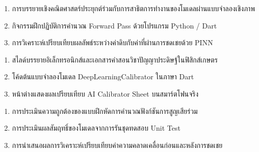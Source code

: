 \begin{tcolorbox}[
    enhanced, breakable,
    colback=white, colframe=rbruNavy,
    fonttitle=\bfseries\color{white},
    title={3. วิธีสอนและกิจกรรมการเรียนการสอน},
    arc=1.5mm, boxrule=0.8pt, leftrule=3.5mm
]
\begin{enumerate}
    \item การบรรยายเชิงคณิตศาสตร์ประยุกต์ร่วมกับการสาธิตการทำงานของโมเดลผ่านแบบจำลองเชิงภาพ
    \item กิจกรรมฝึกปฏิบัติการคำนวณ Forward Pass ด้วยโปรแกรม Python / Dart
    \item การวิเคราะห์เปรียบเทียบผลลัพธ์ระหว่างค่าดิบกับค่าที่ผ่านการชดเชยด้วย PINN
\end{enumerate}
\end{tcolorbox}

\begin{tcolorbox}[
    enhanced, breakable,
    colback=white, colframe=rbruNavy,
    fonttitle=\bfseries\color{white},
    title={4. สื่อการเรียนการสอน},
    arc=1.5mm, boxrule=0.8pt, leftrule=3.5mm
]
\begin{enumerate}
    \item สไลด์บรรยายอิเล็กทรอนิกส์และเอกสารคำสอนวิชาปัญญาประดิษฐ์ในฟิสิกส์เกษตร
    \item โค้ดต้นแบบจำลองโมเดล DeepLearningCalibrator ในภาษา Dart
    \item หน้าต่างแสดงผลเปรียบเทียบ AI Calibrator Sheet บนสมาร์ตโฟนจริง
\end{enumerate}
\end{tcolorbox}

\begin{tcolorbox}[
    enhanced, breakable,
    colback=white, colframe=rbruNavy,
    fonttitle=\bfseries\color{white},
    title={5. การวัดและประเมินผล},
    arc=1.5mm, boxrule=0.8pt, leftrule=3.5mm
]
\begin{enumerate}
    \item การประเมินความถูกต้องของแบบฝึกหัดการคำนวณฟังก์ชันการสูญเสียร่วม
    \item การประเมินผลสัมฤทธิ์ของโมเดลจากการรันชุดทดสอบ Unit Test
    \item การนำเสนอผลการวิเคราะห์เปรียบเทียบค่าความคลาดเคลื่อนก่อนและหลังการชดเชย
\end{enumerate}
\end{tcolorbox}

\clearpage


